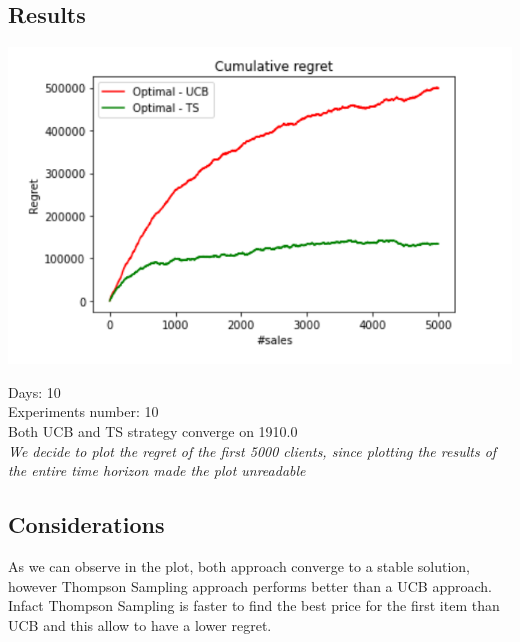 \subsection*{Results}
\begin{center}
	\includegraphics[scale=1.2]{Images/n3}
\end{center}
Days: 10\\
Experiments number: 10 \\
Both UCB and TS strategy converge on 1910.0\\
\textit{We decide to plot the regret of the first 5000 clients, since plotting the results of the entire time horizon made the plot unreadable}


\subsection*{Considerations}
As we can observe in the plot, both approach converge to a stable solution, however Thompson Sampling approach performs better than a UCB approach. Infact Thompson Sampling is faster to find the best price for the first item than UCB and this allow to have a lower regret. 